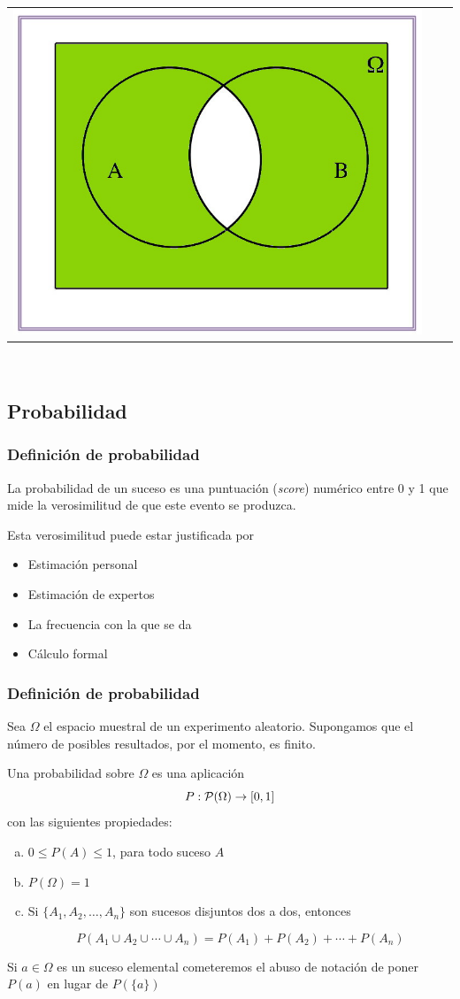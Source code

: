 \documentclass[handout]{beamer}\usepackage[]{graphicx}\usepackage[]{color}
\renewcommand{\emph}[1]{{\color{red}#1}}
\renewcommand{\leq}{\leqslant}
\theoremstyle{plain}
\theoremstyle{definition}
\newcommand{\EM}{\Omega}
\begin{document}
\begin{frame}
\begin{enumerate}
\begin{center}
\begin{tabular}{ccc}
\includegraphics[width=0.3\linewidth]{demorgan4.jpg}
\end{tabular}\\[2ex]

\end{center}
\end{enumerate}

\end{frame}



\subsection{Probabilidad}
\begin{frame}
\frametitle{Definición de probabilidad}

La probabilidad de un suceso es una puntuación (\textsl{score}) numérico entre 0 y 1 que mide la verosimilitud de que este evento se produzca.
\medskip

Esta verosimilitud puede estar justificada por 
\begin{itemize}
\item Estimación personal
\item Estimación de expertos
\item La frecuencia con la que se da 
\item Cálculo formal
\end{itemize}

\end{frame}


\begin{frame}
\frametitle{Definición de probabilidad}
\vspace*{-1ex}

Sea $\EM$ el espacio muestral de un experimento aleatorio. 
\emph{Supongamos que el número de posibles resultados, por el momento, es finito.}

Una \emph{probabilidad} sobre $\EM$ es una aplicación
$$
P:{\cal P}(\EM)\to [0,1]
$$
con las siguientes propiedades:

\begin{enumerate}[a)]
\item $0\leq P(A)\leq 1$, para todo suceso $A$ 
\item $P(\EM)=1$
\item Si $\{A_1,A_2,\ldots,A_n\}$ son sucesos disjuntos dos a dos, entonces

$$
P(A_1\cup A_2\cup \cdots \cup A_n)=P(A_1)+P(A_2)+\cdots +P(A_n)
$$
\end{enumerate}

Si $a\in \Omega$ es un suceso elemental cometeremos el abuso de notación de poner $P(a)$ en lugar de $P(\{a\})$
\end{frame}
\end{document}
